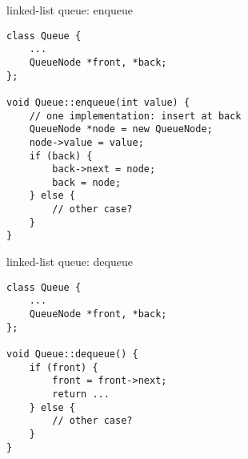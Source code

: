 \begin{frame}[fragile,label=llEnqueue]{linked-list queue: enqueue}
\lstset{language=C++,style=small}
\begin{lstlisting}
class Queue {
    ...
    QueueNode *front, *back;
};

void Queue::enqueue(int value) {
    // one implementation: insert at back
    QueueNode *node = new QueueNode;
    node->value = value;
    if (back) {
        back->next = node;
        back = node;
    } else {
        // other case?
    }
}
\end{lstlisting}
\end{frame}


\begin{frame}[fragile,label=llDequeue]{linked-list queue: dequeue}
\lstset{language=C++,style=small}
\begin{lstlisting}
class Queue {
    ...
    QueueNode *front, *back;
};

void Queue::dequeue() {
    if (front) {
        front = front->next;
        return ...
    } else {
        // other case?
    }
}
\end{lstlisting}
\end{frame}
